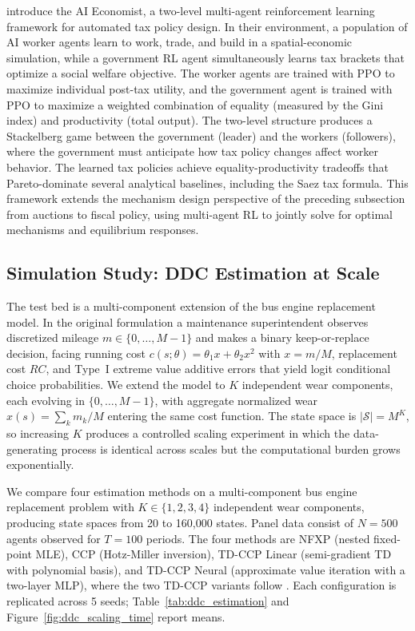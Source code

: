 \citet{Zheng2021} introduce the AI Economist, a two-level multi-agent reinforcement learning framework for automated tax policy design. In their environment, a population of AI worker agents learn to work, trade, and build in a spatial-economic simulation, while a government RL agent simultaneously learns tax brackets that optimize a social welfare objective. The worker agents are trained with PPO to maximize individual post-tax utility, and the government agent is trained with PPO to maximize a weighted combination of equality (measured by the Gini index) and productivity (total output). The two-level structure produces a Stackelberg game between the government (leader) and the workers (followers), where the government must anticipate how tax policy changes affect worker behavior. The learned tax policies achieve equality-productivity tradeoffs that Pareto-dominate several analytical baselines, including the Saez tax formula. This framework extends the mechanism design perspective of the preceding subsection from auctions to fiscal policy, using multi-agent RL to jointly solve for optimal mechanisms and equilibrium responses.


\subsection{Simulation Study: DDC Estimation at Scale}
\label{sec:ddc_estimation_sim}

The test bed is a multi-component extension of the \citet{Rust1987} bus engine replacement model. In the original formulation a maintenance superintendent observes discretized mileage $m\in\{0,\ldots,M{-}1\}$ and makes a binary keep-or-replace decision, facing running cost $c(s;\theta)=\theta_1 x+\theta_2 x^2$ with $x=m/M$, replacement cost $RC$, and Type~I extreme value additive errors that yield logit conditional choice probabilities. We extend the model to $K$ independent wear components, each evolving in $\{0,\ldots,M{-}1\}$, with aggregate normalized wear $x(s)=\sum_k m_k/M$ entering the same cost function. The state space is $|\mathcal{S}|=M^K$, so increasing $K$ produces a controlled scaling experiment in which the data-generating process is identical across scales but the computational burden grows exponentially.

We compare four estimation methods on a multi-component bus engine replacement problem \citep{Rust1987} with $K \in \{1,2,3,4\}$ independent wear components, producing state spaces from 20 to 160,000 states. Panel data consist of $N=500$ agents observed for $T=100$ periods. The four methods are NFXP (nested fixed-point MLE), CCP (Hotz-Miller inversion), TD-CCP Linear (semi-gradient TD with polynomial basis), and TD-CCP Neural (approximate value iteration with a two-layer MLP), where the two TD-CCP variants follow \citet{AdusumilliEckardt2022}. Each configuration is replicated across 5 seeds; Table~\ref{tab:ddc_estimation} and Figure~\ref{fig:ddc_scaling_time} report means.

